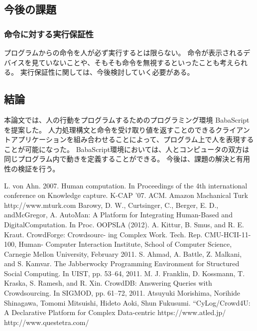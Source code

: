 \documentclass{deimj}
\begin{document}
\subsection{今後の課題}
\subsubsection{命令に対する実行保証性}
プログラムからの命令を人が必ず実行するとは限らない。
命令が表示されるデバイスを見ていないことや、そもそも命令を無視するといったことも考えられる。
実行保証性に関しては、今後検討していく必要がある。

\subsection{結論}
本論文では、人の行動をプログラムするためのプログラミング環境 BabaScript を提案した。
人力処理構文と命令を受け取り値を返すことのできるクライアントアプリケーションを組み合わせることによって、プログラム上で人を表現することが可能になった。
BabaScript環境においては、人とコンピュータの双方は同じプログラム内で動きを定義することができる。
今後は、課題の解決と有用性の検証を行う。

\vspace{30mm}

\begin{thebibliography}{99}
L. von Ahn. 2007. Human computation. In Proceedings of the 4th international conference on Knowledge capture. K-CAP '07. ACM.
Amazon Machanical Turk
http://www.mturk.com
Barowy, D. W., Curtsinger, C., Berger, E. D., andMcGregor, A. AutoMan: A Platform for Integrating Human-Based and DigitalComputation. In Proc. OOPSLA (2012).
A. Kittur, B. Smus, and R. E. Kraut. CrowdForge: Crowdsourc- ing Complex Work. Tech. Rep. CMU-HCII-11-100, Human- Computer Interaction Institute, School of Computer Science, Carnegie Mellon University, February 2011.
S. Ahmad, A. Battle, Z. Malkani, and S. Kamvar. The Jabberwocky Programming Environment for Structured Social Computing. In UIST, pp. 53–64, 2011.
M. J. Franklin, D. Kossmann, T. Kraska, S. Ramesh, and R. Xin. CrowdDB: Answering Queries with Crowdsourcing. In SIGMOD, pp. 61–72, 2011.
 Atsuyuki Morishima, Norihide Shinagawa, Tomomi Mitsuishi, Hideto Aoki, Shun Fukusumi. “CyLog/Crowd4U: A Declarative Platform for Complex Data-centric
https://www.atled.jp/
http://www.questetra.com/
\end{thebibliography}
\end{document}
